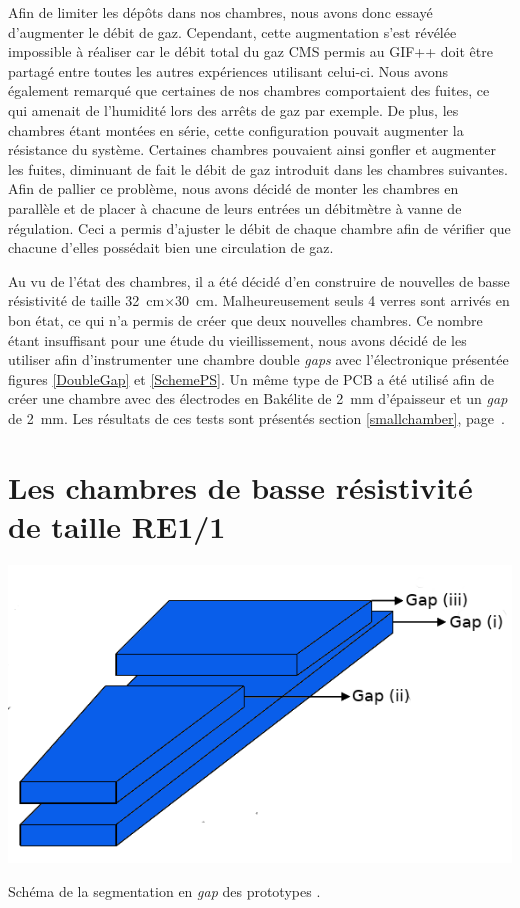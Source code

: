 Afin de limiter les dépôts dans nos chambres, nous avons donc essayé d'augmenter le débit de gaz. Cependant, cette augmentation s'est révélée impossible à réaliser car le débit total du gaz CMS permis au GIF++ doit être partagé entre toutes les autres expériences utilisant celui-ci.
Nous avons également remarqué que certaines de nos chambres comportaient des fuites, ce qui amenait de l'humidité lors des arrêts de gaz par exemple. De plus, les chambres étant montées en série, cette configuration pouvait augmenter la résistance du système. Certaines chambres pouvaient ainsi gonfler et augmenter les fuites, diminuant de fait le débit de gaz introduit dans les chambres suivantes. Afin de pallier ce problème, nous avons décidé de monter les chambres en parallèle et de placer à chacune de leurs entrées un débitmètre à vanne de régulation. Ceci a permis d'ajuster le débit de chaque chambre afin de vérifier que chacune d'elles possédait bien une circulation de gaz.

Au vu de l'état des chambres, il a été décidé d'en construire de nouvelles de basse résistivité de taille \SI{32}{\centi\meter}$\times$\SI{30}{\centi\meter}. Malheureusement seuls \num{4} verres sont arrivés en bon état, ce qui n'a permis de créer que deux nouvelles chambres. Ce nombre étant insuffisant pour une étude du vieillissement, nous avons décidé de les utiliser afin d'instrumenter une chambre double \textit{gaps} avec l'électronique présentée figures \ref{DoubleGap} et \ref{SchemePS}. Un même type de PCB a été utilisé afin de créer une chambre avec des électrodes en Bakélite de \SI{2}{\milli\meter} d'épaisseur et un \textit{gap} de \SI{2}{\milli\meter}. Les résultats de ces tests sont présentés section \ref{smallchamber}, page~\pageref{smallchamber}.

\newpage
\section{Les chambres de basse résistivité de taille RE1/1}

\marginpar
{
	\centering
	\includegraphics[width=1.0\marginparwidth]{GLA/gaps.png}
	\captionsetup{type=figure}\caption{Schéma de la segmentation en \textit{gap} des prototypes \cite{gapss}.}
	\label{gap}
}

